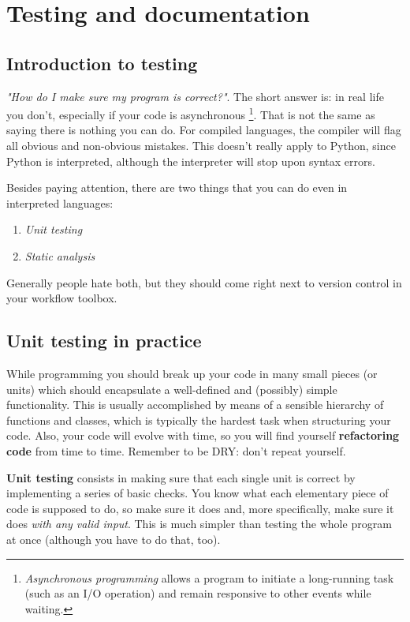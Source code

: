 \section{Testing and documentation}

\subsection{Introduction to testing}

\textit{"How do I make sure my program is correct?"}. The short answer is: in real life you don't, especially if your code is asynchronous \footnote{\textit{Asynchronous programming} allows a program to initiate a long-running task (such as an I/O operation) and remain responsive to other events while waiting.}. That is not the same as saying there is nothing you can do. For compiled languages, the compiler will flag all obvious and non-obvious mistakes. This doesn't really apply to Python, since Python is interpreted, although the interpreter will stop upon syntax errors.

Besides paying attention, there are two things that you can do even in interpreted languages:
\begin{enumerate}
    \item \textit{Unit testing}
    \item \textit{Static analysis}
\end{enumerate}
Generally people hate both, but they should come right next to version control in your workflow toolbox.

\subsection{Unit testing in practice}

While programming you should break up your code in many small pieces (or units) which should encapsulate a well-defined and (possibly) simple functionality. This is usually accomplished by means of a sensible hierarchy of functions and classes, which is typically the hardest task when structuring your code. Also, your code will evolve with time, so you will find yourself \textbf{refactoring code} from time to time. Remember to be DRY: don't repeat yourself.

\textbf{Unit testing} consists in making sure that each single unit is correct by implementing a series of basic checks. You know what each elementary piece of code is supposed to do, so make sure it does and, more specifically, make sure it does \textit{with any valid input}. This is much simpler than testing the whole program at once (although you have to do that, too).


